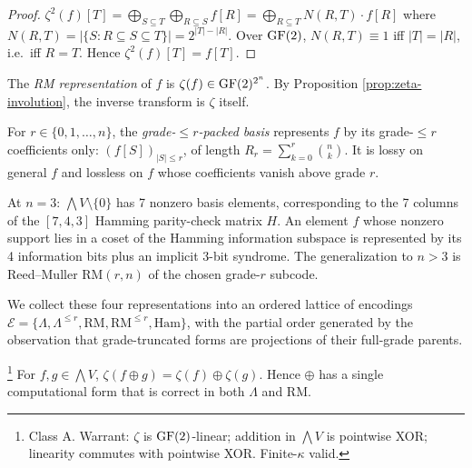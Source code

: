 \begin{proof}
  $\zeta^2(f)[T] = \bigoplus_{S \subseteq T}
   \bigoplus_{R \subseteq S} f[R] =
   \bigoplus_{R \subseteq T} N(R,T) \cdot f[R]$
  where $N(R,T) = |\{S : R \subseteq S \subseteq T\}|
  = 2^{|T| - |R|}$. Over $\operatorname{GF}(2)$, $N(R,T) \equiv 1$ iff
  $|T| = |R|$, i.e.\ iff $R = T$. Hence
  $\zeta^2(f)[T] = f[T]$.
\end{proof}

\begin{definition}\label{def:rm}
  The \emph{RM representation} of $f$ is $\zeta(f) \in
  \operatorname{GF}(2)^{2^n}$. By Proposition \ref{prop:zeta-involution},
  the inverse transform is $\zeta$ itself.
\end{definition}

\begin{definition}\label{def:grade-packed}
  For $r \in \{0, 1, \ldots, n\}$, the
  \emph{grade-$\leq r$-packed basis} represents $f$ by
  its grade-$\leq r$ coefficients only:
  $(f[S])_{|S| \leq r}$, of length
  $R_r = \sum_{k=0}^{r} \binom{n}{k}$. It is lossy on
  general $f$ and lossless on $f$ whose coefficients
  vanish above grade $r$.
\end{definition}

\begin{definition}\label{def:hamming}
  At $n = 3$: $\bigwedge V \setminus \{0\}$ has 7 nonzero
  basis elements, corresponding to the 7 columns of the
  $[7,4,3]$ Hamming parity-check matrix $H$. An element
  $f$ whose nonzero support lies in a coset of the
  Hamming information subspace is represented by its 4
  information bits plus an implicit 3-bit syndrome.
  The generalization to $n > 3$ is Reed--Muller
  $\mathrm{RM}(r, n)$ of the chosen grade-$r$ subcode.
\end{definition}

We collect these four representations into an ordered
lattice of encodings $\mathcal{E} = \{\Lambda,
\Lambda^{\leq r}, \mathrm{RM}, \mathrm{RM}^{\leq r},
\mathrm{Ham}\}$, with the partial order generated by the
observation that grade-truncated forms are projections
of their full-grade parents.

\begin{proposition}
  \label{prop:encoding-commute}
  \footnote{Class \textsf{A}. Warrant: $\zeta$ is
  $\operatorname{GF}(2)$-linear; addition in $\bigwedge V$ is
  pointwise XOR; linearity commutes with pointwise XOR.
  Finite-$\kappa$ valid.}
  For $f, g \in \bigwedge V$,
  $\zeta(f \oplus g) = \zeta(f) \oplus \zeta(g)$.
  Hence $\oplus$ has a single computational form that
  is correct in both $\Lambda$ and $\mathrm{RM}$.
\end{proposition}

